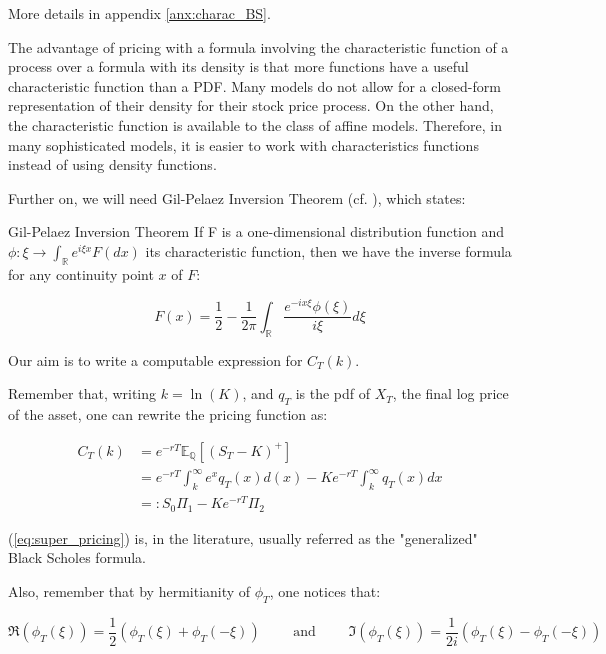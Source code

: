 More details in appendix \ref{anx:charac_BS}.

The advantage of pricing with a formula involving the characteristic function of a process over a formula with its density is that more functions have a useful characteristic function than a PDF. Many models do not allow for a closed-form representation of their density for their stock price process. On the other hand, the characteristic function is available to the class of affine models. Therefore, in many sophisticated models, it is easier to work with characteristics functions instead of using density functions.

Further on, we will need Gil-Pelaez Inversion Theorem (cf. \cite{gil_pelaez}), which states:

\begin{theoreme}{Gil-Pelaez Inversion Theorem}
If F is a one-dimensional distribution function and $\phi \colon \xi \to \int_{\mathbb R} e^{i \xi x} F(dx) $  its characteristic function, then we have the inverse formula for any
continuity point $x$ of $F$:

$$ F(x) = \frac 1 2 - \frac 1 { 2 \pi} \int_{\mathbb R} \frac{e^{- i x \xi } \phi ( \xi )  }  { i \xi }  d \xi $$

\end{theoreme}

Our aim is to write a computable expression for $C_T(k)$.


Remember that, writing $k = \ln(K)$, and $q_T$ is the pdf of $X_T$, the final log price of the asset, one can rewrite the pricing function as:

\begin{align}
C_T( k ) &=  e^{-r T}  \mathbb E_{\mathbb Q} [ (S_T - K)^+ ] \nonumber  \\
&= e^{-rT} \int_k^{\infty} e^x q_T(x) d(x) - K e^{-rT} \int_k^{\infty} q_T(x) dx \nonumber \\
&=: S_0 \Pi_1 - K e^{-r T} \Pi_2 
\label{eq:super_pricing}
\end{align}

(\ref{eq:super_pricing}) is, in the literature, usually referred as the "generalized" Black Scholes formula.

Also, remember that by hermitianity of $\phi_T$, one notices that:

$$ \mathfrak{R} ( \phi_T ( \xi) ) = \frac 1 2 \left ( \phi_T (\xi) + \phi_T (-\xi) \right ) \qquad  \text{ and } \qquad \mathfrak{I} ( \phi_T ( \xi) ) = \frac 1 {2i} \left ( \phi_T (\xi) - \phi_T (-\xi) \right ) $$

